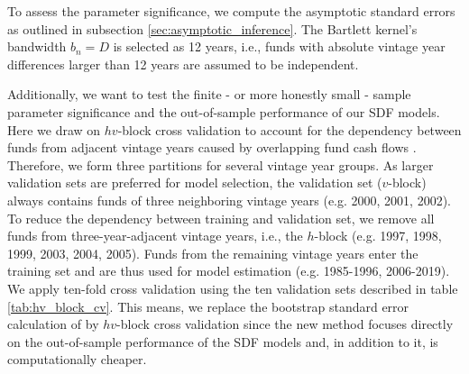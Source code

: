 \documentclass[12pt]{article}
\begin{document}
To assess the parameter significance, we compute the asymptotic standard errors as outlined in subsection \ref{sec:asymptotic_inference}.
The Bartlett kernel's bandwidth $b_n=D$ is selected as 12 years, i.e., funds with absolute vintage year differences larger than 12 years are assumed to be independent.

Additionally, we want to test the finite - or more honestly small - sample parameter significance and the out-of-sample performance of our SDF models.
Here we draw on $hv$-block cross validation to account for the dependency between funds from adjacent vintage years caused by overlapping fund cash flows \citep{R00}. 
Therefore, we form three partitions for several vintage year groups. 
As larger validation sets are preferred for model selection, the validation set ($v$-block) always contains funds of three neighboring vintage years (e.g. 2000, 2001, 2002). 
To reduce the dependency between training and validation set, we remove all funds from three-year-adjacent vintage years, i.e., the $h$-block (e.g. 1997, 1998, 1999, 2003, 2004, 2005). 
Funds from the remaining vintage years enter the training set and are thus used for model estimation (e.g. 1985-1996, 2006-2019).
We apply ten-fold cross validation using the ten validation sets described in table \ref{tab:hv_block_cv}.
This means, we replace the bootstrap standard error calculation of \cite{DLP12} by $hv$-block cross validation since the new method focuses directly on the out-of-sample performance of the SDF models and, in addition to it, is computationally cheaper.
 
\end{document}
